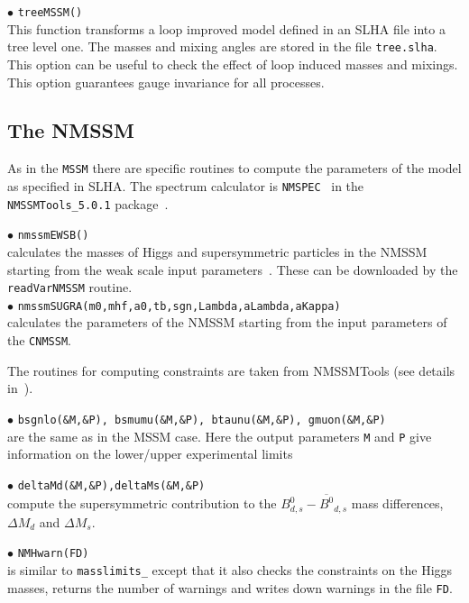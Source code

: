 \documentclass[12pt,a4paper]{article}
\begin{document}
\noi $\bullet$ \verb|treeMSSM()|\\
This function transforms a loop improved model defined in an SLHA file  into a tree level one. The masses and mixing angles are stored in the file
 {\tt tree.slha}. This option can be useful to check the effect of loop induced
masses and mixings. This option  guarantees gauge invariance for all processes.  


\subsection{The NMSSM}

As in the {\tt MSSM} there are specific routines to compute the  
parameters of the model as  specified in SLHA. The spectrum calculator is \verb|NMSPEC|~\cite{Ellwanger:2006rn}
 in the \verb|NMSSMTools_5.0.1| package~\cite{nmssmtools}.

\noindent$\bullet$ \verb|nmssmEWSB()|\\
calculates the masses of Higgs and supersymmetric particles in the NMSSM
starting from the weak scale input parameters~\cite{Ellwanger:2005dv}. These  can be downloaded by the 
{\tt readVarNMSSM} routine.\\   
\noindent$\bullet$ \verb|nmssmSUGRA(m0,mhf,a0,tb,sgn,Lambda,aLambda,aKappa)|\\
calculates the parameters of the NMSSM starting from the input parameters of 
the \verb|CNMSSM|.

The routines for computing constraints are taken from NMSSMTools (see details  in~\cite{Belanger:2006is}).

\noindent
$\bullet$ {\tt bsgnlo(\&M,\&P), bsmumu(\&M,\&P), btaunu(\&M,\&P),  gmuon(\&M,\&P)}\\ 
are the same as in the MSSM case.  Here the output parameters {\tt M} and {\tt P} 
give information on the lower/upper experimental limits~\cite{Domingo:2007dx}



\noindent$\bullet$ {\tt deltaMd(\&M,\&P),deltaMs(\&M,\&P)}\\
compute the supersymmetric contribution to the $B^0_{d,s}-\overline{B^0}_{d,s}$ mass differences, $\Delta M_d$ and $\Delta M_s$.

\noindent$\bullet$ \verb|NMHwarn(FD)|\\
is similar to {\tt masslimits\_} except that it also checks the 
constraints on the Higgs masses, returns the number of warnings and 
writes down  warnings in the file \verb|FD|.  
\end{document}
